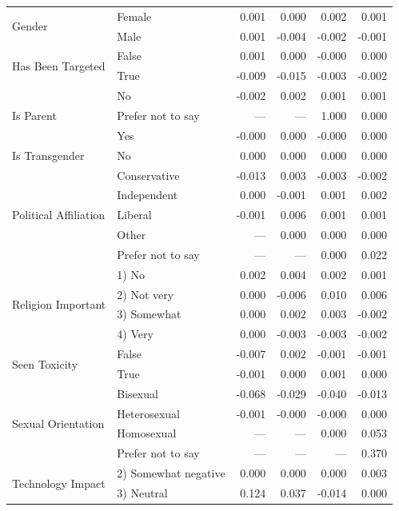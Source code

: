 \begin{longtable}{llrrrr}
\cline{1-6}
\multirow[t]{2}{*}{Gender} & Female & 0.001 & 0.000 & 0.002 & 0.001 \\
 & Male & 0.001 & -0.004 & -0.002 & -0.001 \\
\cline{1-6}
\multirow[t]{2}{*}{Has Been Targeted} & False & 0.001 & 0.000 & -0.000 & 0.000 \\
 & True & -0.009 & -0.015 & -0.003 & -0.002 \\
\cline{1-6}
\multirow[t]{3}{*}{Is Parent} & No & -0.002 & 0.002 & 0.001 & 0.001 \\
 & Prefer not to say & --- & --- & 1.000 & 0.000 \\
 & Yes & -0.000 & 0.000 & -0.000 & 0.000 \\
\cline{1-6}
Is Transgender & No & 0.000 & 0.000 & 0.000 & 0.000 \\
\cline{1-6}
\multirow[t]{5}{*}{Political Affiliation} & Conservative & -0.013 & 0.003 & -0.003 & -0.002 \\
 & Independent & 0.000 & -0.001 & 0.001 & 0.002 \\
 & Liberal & -0.001 & 0.006 & 0.001 & 0.001 \\
 & Other & --- & 0.000 & 0.000 & 0.000 \\
 & Prefer not to say & --- & --- & 0.000 & 0.022 \\
\cline{1-6}
\multirow[t]{4}{*}{Religion Important} & 1) No & 0.002 & 0.004 & 0.002 & 0.001 \\
 & 2) Not very & 0.000 & -0.006 & 0.010 & 0.006 \\
 & 3) Somewhat & 0.000 & 0.002 & 0.003 & -0.002 \\
 & 4) Very & 0.000 & -0.003 & -0.003 & -0.002 \\
\cline{1-6}
\multirow[t]{2}{*}{Seen Toxicity} & False & -0.007 & 0.002 & -0.001 & -0.001 \\
 & True & -0.001 & 0.000 & 0.001 & 0.000 \\
\cline{1-6}
\multirow[t]{4}{*}{Sexual Orientation} & Bisexual & -0.068 & -0.029 & -0.040 & -0.013 \\
 & Heterosexual & -0.001 & -0.000 & -0.000 & 0.000 \\
 & Homosexual & --- & --- & 0.000 & 0.053 \\
 & Prefer not to say & --- & --- & --- & 0.370 \\
\cline{1-6}
\multirow[t]{4}{*}{Technology Impact} & 2) Somewhat negative & 0.000 & 0.000 & 0.000 & 0.003 \\
 & 3) Neutral & 0.124 & 0.037 & -0.014 & 0.000 \\

\end{longtable}
